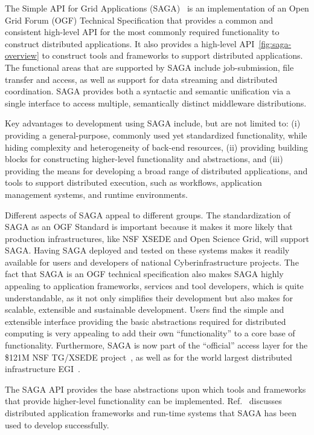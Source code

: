 \documentclass[]{svjour3}
\begin{document}
The Simple API for Grid Applications (SAGA)~\cite{saga_url} is an implementation
of an Open Grid Forum (OGF) Technical Specification that provides a common and
consistent high-level API for the most commonly required functionality to
construct distributed applications. It also provides a high-level API~\ref{fig:saga-overview}
to construct tools and frameworks to support distributed applications. The
functional areas that are supported by SAGA include job-submission, file transfer
and access, as well as support for data streaming and distributed coordination.
SAGA provides both a syntactic and semantic unification via a single interface to
access multiple, semantically distinct middleware distributions.

Key advantages to development using SAGA include, but are not limited to:
(i) providing a general-purpose, commonly used yet standardized functionality, while
hiding complexity and heterogeneity of back-end resources, (ii)
providing building blocks for constructing higher-level functionality
and abstractions, and (iii) providing the means for developing a broad
range of distributed applications, and tools to support distributed
execution, such as workflows, application management systems, and runtime environments.

Different aspects of SAGA appeal to different groups. The standardization
of SAGA as an OGF Standard is important because it makes it more likely that
production infrastructures, like NSF XSEDE and Open Science Grid, will support
SAGA. Having SAGA deployed and tested on these systems makes it
readily available for users and developers of national Cyberinfrastructure
projects. The fact that SAGA is an OGF technical specification also makes
SAGA highly appealing to application frameworks, services and tool developers,
which is quite understandable, as it not only simplifies their development but also
makes for scalable, extensible and sustainable development. Users find
the simple and extensible interface providing the basic abstractions
required for distributed computing is very appealing to add their own
“functionality” to a core base of functionality. Furthermore, SAGA is
now part of the “official” access layer for the \$121M NSF TG/XSEDE
project~\cite{XSEDE}, as well as for the world largest
distributed infrastructure EGI~\cite{EGI}.

The SAGA API provides the base abstractions upon which tools and
frameworks that provide higher-level functionality can be
implemented. Ref.~\cite{saga_url} discusses distributed application
frameworks and run-time systems that SAGA has been used to develop
successfully. 
\end{document}
